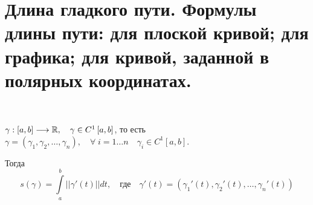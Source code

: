 \documentclass[../main.tex]{subfiles}
\begin{document}
\newpage
\section{Длина гладкого пути. Формулы длины пути: для плоской кривой; для графика; для кривой, заданной в полярных координатах.}
\begin{thm}
    
    ~

    \( \gamma : \left[ a,b\right] \longrightarrow \mathbb{R},\quad \gamma \in C^1\left[ a,b\right]\), то есть \( \gamma =\left( \gamma _1, \gamma _2, \ldots , \gamma _n\right),\quad \forall \; i=1 \ldots n\quad \gamma _i \in C^1[a,b]\).

    Тогда 
    \[ s\left( \gamma \right)= \displaystyle\int\limits_{ a}^{ b} \left| \left| \gamma '\left( t\right)\right|\right|dt,\quad \text{где}\quad \gamma '\left( t\right)=\left( \gamma _1'\left( t\right), \gamma _2'(t), \ldots , \gamma _n'\left( t\right)\right)\]
\end{thm}
\end{document}
